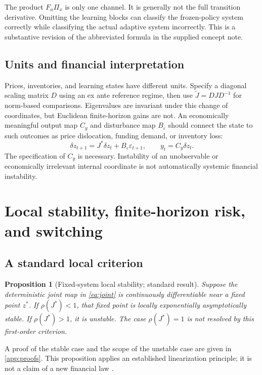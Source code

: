\documentclass[11pt,a4paper]{article}
\newtheorem{proposition}[theorem]{Proposition}
\theoremstyle{definition}
\theoremstyle{remark}
\begin{document}
The product $F_u\Pi_x$ is only one channel. It is generally not the full transition derivative. Omitting the learning blocks can classify the frozen-policy system correctly while classifying the actual adaptive system incorrectly. This is a substantive revision of the abbreviated formula in the supplied concept note.

\subsection{Units and financial interpretation}
Prices, inventories, and learning states have different units. Specify a diagonal scaling matrix $D$ using an ex ante reference regime, then use $\widetilde J=D J D^{-1}$ for norm-based comparisons. Eigenvalues are invariant under this change of coordinates, but Euclidean finite-horizon gains are not. An economically meaningful output map $C_y$ and disturbance map $B_\varepsilon$ should connect the state to such outcomes as price dislocation, funding demand, or inventory loss:
\begin{equation}
 \delta z_{t+1}=J^*\delta z_t+B_\varepsilon\varepsilon_{t+1},\qquad
 y_t=C_y\delta z_t.
 \label{eq:linear}
\end{equation}
The specification of $C_y$ is necessary. Instability of an unobservable or economically irrelevant internal coordinate is not automatically systemic financial instability.

\section{Local stability, finite-horizon risk, and switching}
\label{sec:stability}
\subsection{A standard local criterion}
\begin{proposition}[Fixed-system local stability; standard result]
\label{prop:local}
Suppose the deterministic joint map in \cref{eq:joint} is continuously differentiable near a fixed point $z^*$. If $\rho(J^*)<1$, that fixed point is locally exponentially asymptotically stable. If $\rho(J^*)>1$, it is unstable. The case $\rho(J^*)=1$ is not resolved by this first-order criterion.
\end{proposition}
A proof of the stable case and the scope of the unstable case are given in \cref{app:proofs}. This proposition applies an established linearization principle; it is not a claim of a new financial law \citep{khalil2002}.
\end{document}
